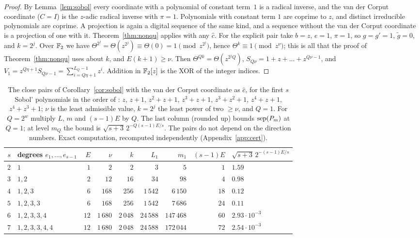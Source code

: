 \begin{proof}
By Lemma~\ref{lem:sobol} every coordinate with a polynomial of constant term~$1$ is a radical inverse, and the van der Corput coordinate ($C=I$) is the $z$-adic radical inverse with $\pi=1$. Polynomials with constant term $1$ are coprime to $z$, and distinct irreducible polynomials are coprime. A projection is again a digital sequence of the same kind, and a sequence without the van der Corput coordinate is a projection of one with it. Theorem~\ref{thm:nonqu} applies with any $\hat c$. For the explicit pair take $b=z$, $e=1$, $\pi=1$, so $g=g'=1$, $\tilde g=0$, and $k=2^j$. Over $\mathbb{F}_2$ we have $\Theta^{2^j}=\Theta(z^{2^j})\equiv\Theta(0)=1\pmod{z^{2^j}}$, hence $\Theta^k\equiv1\pmod{z^\nu}$; this is all that the proof of Theorem~\ref{thm:nonqu} uses about $k$, and $E(k+1)\ge\nu$. Then $\Theta^{Qk}=\Theta(z^{2^jQ})$, $S_{Q\nu}=1+z+\dots+z^{Q\nu-1}$, and $V_1=z^{Q\eta+1}S_{Q\nu-1}=\sum_{i=Q\eta+1}^{L_Q-1}z^i$. Addition in $\mathbb{F}_2[z]$ is the XOR of the integer indices.
\end{proof}

\begin{table}[t]
\centering\small
\caption{The close pairs of Corollary~\ref{cor:sobol} with the van der Corput coordinate as $\hat c$, for the first $s$ Sobol' polynomials in the order of \cite{BF88,JK08}: $z$, $z+1$, $z^2+z+1$, $z^3+z+1$, $z^3+z^2+1$, $z^4+z+1$, $z^4+z^3+1$; $\nu$ is the least admissible value, $k=2^j$ the least power of two $\ge\nu$, and $Q=1$. For $Q=2^w$ multiply $L$, $m$ and $(s-1)E$ by $Q$. The last column (rounded up) bounds $\operatorname{sep}(P_m)$ at $Q=1$; at level $m_Q$ the bound is $\sqrt{s+3}\,2^{-Q(s-1)E/s}$. The pairs do not depend on the direction numbers. Exact computation, recomputed independently (Appendix~\ref{app:cert}).}
\label{tab:sobolpar}
\begin{tabular}{rlrrrrrrl}
\toprule
$s$ & degrees $e_1,\dots,e_{s-1}$ & $E$ & $\nu$ & $k$ & $L_1$ & $m_1$ & $(s-1)E$ & $\sqrt{s+3}\,2^{-(s-1)E/s}$\\
\midrule
$2$ & $1$ & $1$ & $2$ & $2$ & $3$ & $5$ & $1$ & $1.59$\\
$3$ & $1,2$ & $2$ & $12$ & $16$ & $34$ & $98$ & $4$ & $0.98$\\
$4$ & $1,2,3$ & $6$ & $168$ & $256$ & $1\,542$ & $6\,150$ & $18$ & $0.12$\\
$5$ & $1,2,3,3$ & $6$ & $168$ & $256$ & $1\,542$ & $7\,686$ & $24$ & $0.11$\\
$6$ & $1,2,3,3,4$ & $12$ & $1\,680$ & $2\,048$ & $24\,588$ & $147\,468$ & $60$ & $2.93\cdot10^{-3}$\\
$7$ & $1,2,3,3,4,4$ & $12$ & $1\,680$ & $2\,048$ & $24\,588$ & $172\,044$ & $72$ & $2.54\cdot10^{-3}$\\
\bottomrule
\end{tabular}
\end{table}

